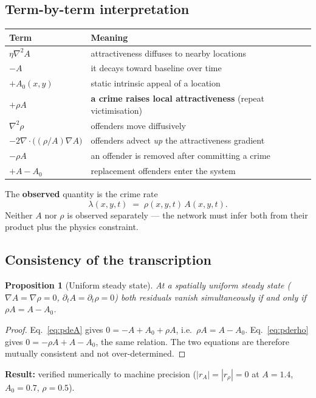 \documentclass[11pt,a4paper]{article}
\newtheorem{proposition}{Proposition}
\begin{document}
\subsection{Term-by-term interpretation}
\begin{center}
\begin{tabular}{ll}
\toprule
\textbf{Term} & \textbf{Meaning} \\
\midrule
$\eta\nabla^2 A$ & attractiveness diffuses to nearby locations \\
$-A$ & it decays toward baseline over time \\
$+A_0(x,y)$ & static intrinsic appeal of a location \\
$+\rho A$ & \textbf{a crime raises local attractiveness} (repeat victimisation) \\
\midrule
$\nabla^2\rho$ & offenders move diffusively \\
$-2\nabla\!\cdot\!\big((\rho/A)\nabla A\big)$ & offenders advect \emph{up} the attractiveness gradient \\
$-\rho A$ & an offender is removed after committing a crime \\
$+A - A_0$ & replacement offenders enter the system \\
\bottomrule
\end{tabular}
\end{center}

\noindent The \textbf{observed} quantity is the crime rate
\begin{equation}
\lambda(x,y,t) \;=\; \rho(x,y,t)\,A(x,y,t).
\label{eq:obs}
\end{equation}
Neither $A$ nor $\rho$ is observed separately --- the network must infer both
from their product plus the physics constraint.

\subsection{Consistency of the transcription}
\begin{proposition}[Uniform steady state]
At a spatially uniform steady state ($\nabla A = \nabla\rho = 0$,
$\partial_t A = \partial_t \rho = 0$) both residuals vanish simultaneously
if and only if $\rho A = A - A_0$.
\end{proposition}
\begin{proof}
Eq.~\eqref{eq:pdeA} gives $0 = -A + A_0 + \rho A$, i.e.\ $\rho A = A - A_0$.
Eq.~\eqref{eq:pderho} gives $0 = -\rho A + A - A_0$, the same relation. The two
equations are therefore mutually consistent and not over-determined.
\end{proof}
\noindent \textbf{Result:} verified numerically to machine precision
($|r_A| = |r_\rho| = 0$ at $A = 1.4$, $A_0 = 0.7$, $\rho = 0.5$).
\end{document}
